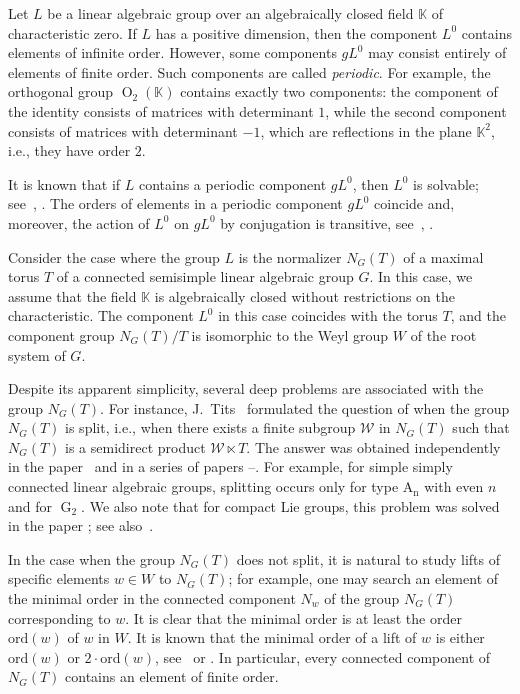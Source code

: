 \documentclass[a4paper,12pt]{amsart}
\theoremstyle{plain}
\theoremstyle{definition}
\newcommand{\KK}{\mathbb{K}}
\newcommand{\ord}{\mathrm{ord}}
\begin{document}
Let $L$ be a linear algebraic group over an algebraically closed field $\KK$ of characteristic zero. If $L$ has a positive dimension, then the component $L^0$ contains elements of infinite order. However, some components $gL^0$ may consist entirely of elements of finite order. Such components are called \emph{periodic}. For example, the orthogonal group $\operatorname{O}_2(\KK)$ contains exactly two components: the component of the identity consists of matrices with determinant $1$, while the second component consists of matrices with determinant $-1$, which are reflections in the plane $\KK^2$, i.e., they have order $2$.

It is known that if $L$ contains a periodic component $gL^0$, then $L^0$ is solvable; see~\cite[Corollary~10.12]{St}, \cite[Theorem~2]{Fe}. The orders of elements in a periodic component $gL^0$ coincide and, moreover, the action of $L^0$ on $gL^0$ by conjugation is transitive, see~\cite[Theorem~10.1]{St}, \cite[Theorem~1]{Fe}.

Consider the case where the group $L$ is the normalizer $N_G(T)$ of a maximal torus $T$ of a connected semisimple linear algebraic group $G$. In this case, we assume that the field $\KK$ is algebraically closed without restrictions on the characteristic. The component $L^0$ in this case coincides with the torus $T$, and the component group $N_G(T)/T$ is isomorphic to the Weyl group $W$ of the root system of $G$.

Despite its apparent simplicity, several deep problems are associated with the group $N_G(T)$. For instance, J.~Tits~\cite{Ti} formulated the question of when the group $N_G(T)$ is split, i.e., when there exists a finite subgroup $\mathcal{W}$ in $N_G(T)$ such that $N_G(T)$ is a semidirect product $\mathcal{W}\ltimes T$. The answer was obtained independently in the paper~\cite{AH} and in a series of papers \cite{G1}--\cite{G4}. For example, for simple simply connected linear algebraic groups, splitting occurs only for type $\operatorname{A_n}$ with even $n$ and for $\operatorname{G}_2$. We also note that for compact Lie groups, this problem was solved in the paper \cite[Theorem~2]{CWW}; see also~\cite{GLO-1, GLO-2}.

In the case when the group $N_G(T)$ does not split, it is natural to study lifts of specific elements $w\in W$ to $N_G(T)$; for example, one may search an element of the minimal order in the connected component $N_w$ of the group $N_G(T)$ corresponding to $w$. It is clear that the minimal order is at least the order $\ord(w)$ of $w$ in  $W$. It is known that the minimal order of a lift of $w$ is either $\ord(w)$ or $2\cdot\ord(w)$, see~\cite{Ti} or \cite[Lemma~2.1]{AH}. In particular, every connected component of $N_G(T)$ contains an element of finite order.
\end{document}
